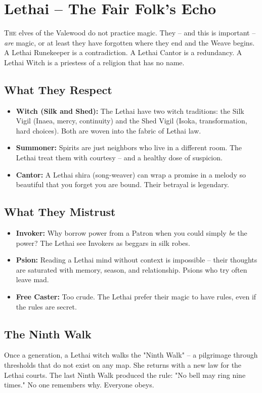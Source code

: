 \documentclass[10pt,a5paper]{book}
\begin{document}
\section{Lethai -- The Fair Folk's Echo}

\lettrine{T}{he} elves of the Valewood do not practice magic. They -- and this is important -- \textit{are} magic, or at least they have forgotten where they end and the Weave begins. A Lethai Runekeeper is a contradiction. A Lethai Cantor is a redundancy. A Lethai Witch is a priestess of a religion that has no name.

\subsection*{What They Respect}
\begin{itemize}
    \item \textbf{Witch (Silk and Shed):} The Lethai have two witch traditions: the Silk Vigil (Inaea, mercy, continuity) and the Shed Vigil (Isoka, transformation, hard choices). Both are woven into the fabric of Lethai law.
    \item \textbf{Summoner:} Spirits are just neighbors who live in a different room. The Lethai treat them with courtesy -- and a healthy dose of suspicion.
    \item \textbf{Cantor:} A Lethai shira (song-weaver) can wrap a promise in a melody so beautiful that you forget you are bound. Their betrayal is legendary.
\end{itemize}

\subsection*{What They Mistrust}
\begin{itemize}
    \item \textbf{Invoker:} Why borrow power from a Patron when you could simply \textit{be} the power? The Lethai see Invokers as beggars in silk robes.
    \item \textbf{Psion:} Reading a Lethai mind without context is impossible -- their thoughts are saturated with memory, season, and relationship. Psions who try often leave mad.
    \item \textbf{Free Caster:} Too crude. The Lethai prefer their magic to have rules, even if the rules are secret.
\end{itemize}

\subsection*{The Ninth Walk}
Once a generation, a Lethai witch walks the "Ninth Walk" -- a pilgrimage through thresholds that do not exist on any map. She returns with a new law for the Lethai courts. The last Ninth Walk produced the rule: "No bell may ring nine times." No one remembers why. Everyone obeys.
\end{document}
